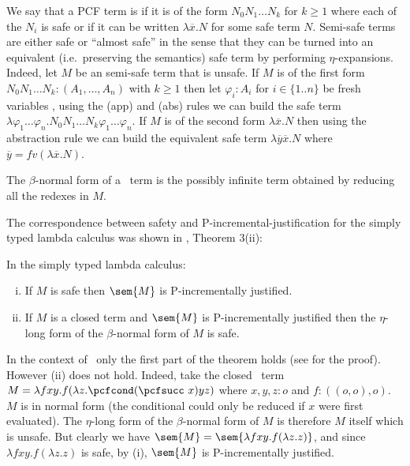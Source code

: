 We say that a PCF term is  if it is of the form $N_0 N_1 \ldots N_k$ for $k\geq 1$ where each of the $N_i$ is safe or if it can be written $\lambda \overline{x} . N$ for some safe term $N$. Semi-safe terms are either safe or ``almost safe'' in the sense that they can be turned into an equivalent (i.e.~preserving the semantics) safe term  by performing $\eta$-expansions. Indeed, let $M$ be an semi-safe term that is unsafe.
If $M$ is of the first form $N_0 N_1 \ldots N_k : (A_1,\ldots,A_n)$ with $k\geq 1$ then let $\varphi_i:A_i$ for $i\in\{1..n\}$ be fresh variables , using the (app) and (abs) rules we can build the safe term $\lambda \varphi_1 \ldots \varphi_n . N_0 N_1 \ldots N_k \varphi_1 \ldots \varphi_n$. If $M$ is of the second form $\lambda \overline{x} . N$ then using the abstraction rule we can build the equivalent safe term $\lambda \overline{y} \overline{x}. N$  where $\overline{y} = fv(\lambda \overline{x}. N)$.

The $\beta$-normal form of a \pcf\ term is the possibly infinite term obtained by reducing all the redexes in $M$.



The correspondence between safety and P-incremental-justification for the simply typed lambda calculus was shown
in \cite{blumong:safelambdacalculus}, Theorem 3(ii):

\begin{theorem}
\label{thm:safeincrejust} In the simply typed lambda calculus:
\begin{enumerate}[(i)]
\item If $M$ is safe then $\sem{M}$ is P-incrementally justified.
\item If $M$ is a closed term and $\sem{M}$ is
  P-incrementally justified then the $\eta$-long form of the
  $\beta$-normal form of $M$ is safe.
\end{enumerate}
\end{theorem}

In the context of \pcf\, only the first part of the theorem holds (see \cite{blumtransfer} for the proof). However (ii) does not hold. Indeed, take the closed \pcf\ term $M = \lambda f x y. f (\lambda z. \pcfcond (\pcfsucc\ x) y z )$ where $x,y,z:o$ and $f:((o,o),o)$. $M$ is in normal form (the conditional  could  only be reduced if $x$ were first evaluated). The $\eta$-long form of the $\beta$-normal form of $M$ is therefore $M$ itself which is unsafe.
But clearly we have $\sem{M} = \sem{\lambda f x y. f (\lambda z. z)}$, and since  $\lambda f x y. f (\lambda z. z)$ is safe, by (i), $\sem{M}$ is P-incrementally justified.

